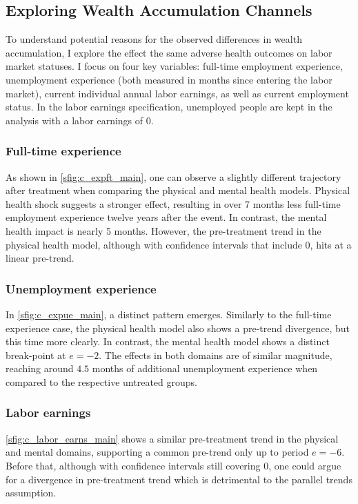 \subsection{Exploring Wealth Accumulation Channels}
\label{sec:secondaryanalysischannels}

To understand potential reasons for the observed differences in wealth accumulation, I explore the effect the
same adverse health outcomes on labor market statuses. I focus on four key variables: full-time employment
experience, unemployment experience (both measured in months since entering the labor market), current
individual annual labor earnings, as well as current employment status. In the labor earnings specification,
unemployed people are kept in the analysis with a labor earnings of 0.


\subsubsection{Full-time experience} As shown in \cref{sfig:c_expft_main}, one can observe a slightly different
trajectory after treatment when comparing the physical and mental health models. Physical health shock suggests
a stronger effect, resulting in over 7 months less full-time employment experience twelve years after the event. In
contrast, the mental health impact is nearly 5 months. However, the pre-treatment trend in the physical health
model, although with confidence intervals that include 0, hits at a linear pre-trend. 


\subsubsection{Unemployment experience} In \cref{sfig:c_expue_main}, a distinct pattern emerges. Similarly to
the full-time experience case, the physical health model also shows a pre-trend divergence, but this time more
clearly. In contrast, the mental health model shows a distinct break-point at $e=-2$. The effects in both domains
are of similar magnitude, reaching around $4.5$ months of additional unemployment experience when compared to
the respective untreated groups.


\subsubsection{Labor earnings} \cref{sfig:c_labor_earns_main} shows a similar pre-treatment trend in the
physical and mental domains, supporting a common pre-trend only up to period $e=-6$. Before that, although with
confidence intervals still covering 0, one could argue for a divergence in pre-treatment trend which is
detrimental to the parallel trends assumption.

